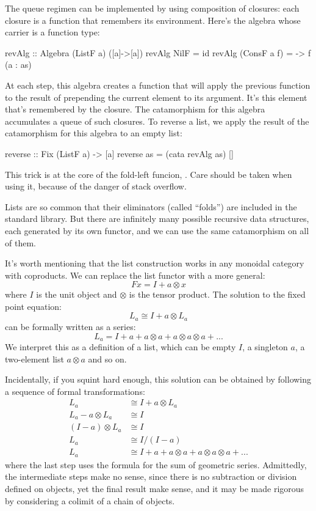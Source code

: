 \documentclass[DaoFP]{subfiles}
\begin{document}
The queue regimen can be implemented by using composition of closures: each closure is a function that remembers its environment. Here's the algebra whose carrier is a function type:
\begin{haskell}
revAlg :: Algebra (ListF a) ([a]->[a])
revAlg NilF = id
revAlg (ConsF a f) = \as -> f (a : as)
\end{haskell}
At each step, this algebra creates a function that will apply the previous function  to the result of prepending the current element  to its argument. It's this element that's remembered by the closure. The catamorphism for this algebra accumulates a queue of such closures. To reverse a list, we apply the result of the catamorphism for this algebra to an empty list:
\begin{haskell}
reverse :: Fix (ListF a) -> [a]
reverse as = (cata revAlg as) []
\end{haskell}
This trick is at the core of the fold-left funcion, . Care should be taken when using it, because of the danger of stack overflow. 

Lists are so common that their eliminators (called ``folds'') are included in the standard library. But there are infinitely many possible recursive data structures, each generated by its own functor, and we can use the same catamorphism on all of them.

It's worth mentioning that the list construction works in any monoidal category with coproducts. We can replace the list functor with a more general:
\[ F x = I + a \otimes x \]
where $I$ is the unit object and $\otimes$ is the tensor product. The solution to the fixed point equation:
\[ L_a \cong I + a \otimes L_a \]
can be formally written as a series:
\[ L_a = I + a + a \otimes a + a \otimes a \otimes a + ... \]
We interpret this as a definition of a list, which can be empty $I$, a singleton $a$, a two-element list $a \otimes a$ and so on.

Incidentally, if you squint hard enough, this solution can be obtained by following a sequence of formal transformations:
\begin{align*}
L_a &\cong I + a \otimes L_a
\\
L_a - a \otimes L_a &\cong I
\\
(I - a) \otimes L_a &\cong I
\\
L_a &\cong I / (I - a)
\\
L_a &\cong I + a + a \otimes a + a \otimes a \otimes a + ...
\end{align*}
where the last step uses the formula for the sum of geometric series. Admittedly, the intermediate steps make no sense, since there is no subtraction or division defined on objects, yet the final result make sense, and it may be made rigorous by considering a colimit of a chain of objects.
\end{document}
